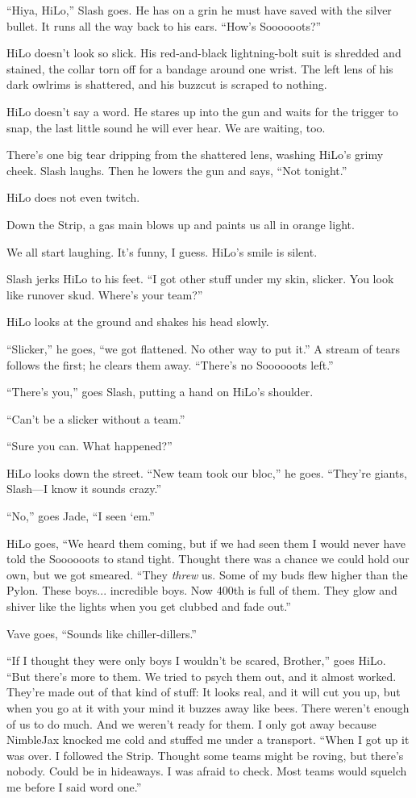 ``Hiya, HiLo,'' Slash goes. He has on a grin he must have saved with the silver bullet. It runs all the way back to his ears. ``How's Soooooots?''

HiLo doesn't look so slick. His red-and-black lightning-bolt suit is shredded and stained, the collar torn off for a bandage around one wrist. The left lens of his dark owlrims is shattered, and his buzzcut is scraped to nothing.

HiLo doesn't say a word. He stares up into the gun and waits for the trigger to snap, the last little sound he will ever hear. We are waiting, too.

There's one big tear dripping from the shattered lens, washing HiLo's grimy cheek. Slash laughs. Then he lowers the gun and says, ``Not tonight.''

HiLo does not even twitch.

Down the Strip, a gas main blows up and paints us all in orange light.

We all start laughing. It's funny, I guess. HiLo's smile is silent.

Slash jerks HiLo to his feet. ``I got other stuff under my skin, slicker. You look like runover skud. Where's your team?''

HiLo looks at the ground and shakes his head slowly.

``Slicker,'' he goes, ``we got flattened. No other way to put it.'' A stream of tears follows the first; he clears them away. ``There's no Soooooots left.''

``There's you,'' goes Slash, putting a hand on HiLo's shoulder.

``Can't be a slicker without a team.''

``Sure you can. What happened?''

HiLo looks down the street. ``New team took our bloc,'' he goes. ``They're giants, Slash—I know it sounds crazy.''

``No,'' goes Jade, ``I seen ‘em.''

HiLo goes, ``We heard them coming, but if we had seen them I would never have told the Soooooots to stand tight. Thought there was a chance we could hold our own, but we got smeared. ``They \textit{threw} us. Some of my buds flew higher than the Pylon. These boys... incredible boys. Now 400th is full of them. They glow and shiver like the lights when you get clubbed and fade out.''

Vave goes, ``Sounds like chiller-dillers.''

``If I thought they were only boys I wouldn't be scared, Brother,'' goes HiLo. ``But there's more to them. We tried to psych them out, and it almost worked. They're made out of that kind of stuff: It looks real, and it will cut you up, but when you go at it with your mind it buzzes away like bees. There weren't enough of us to do much. And we weren't ready for them. I only got away because NimbleJax knocked me cold and stuffed me under a transport.
``When I got up it was over. I followed the Strip. Thought some teams might be roving, but there's nobody. Could be in hideaways. I was afraid to check. Most teams would squelch me before I said word one.''

